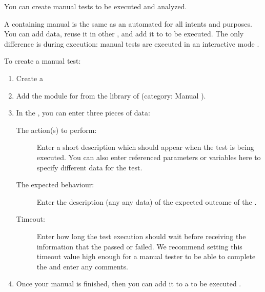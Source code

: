 You can create manual tests to be executed and analyzed.

A \gdcase{} containing manual \gdsteps{} is the same as an automated \gdcase{} for all intents and purposes. You can add data, reuse it in other \gdcases{}, and add it to \gdsuites{} to be executed. The only difference is during execution: manual tests are executed in an interactive mode . 

To create a manual test:
\begin{enumerate}
\item Create a \gdcase{} 
\item Add the module for  from the library of \gdcases{} (category: Manual \gdstep{}).
\item In the \gdpropview{}, you can enter three pieces of data:
\begin{description}
\item[The action(s) to perform:]{Enter a short description which should appear when the test is being executed. You can also enter referenced parameters   or variables  here to specify different data for the test.}
\item [The expected behaviour:]{Enter the description (any any data) of the expected outcome of the \gdstep{}.}
\item [Timeout:]{Enter how long the test execution should wait before receiving the information that the \gdstep{} passed or failed. We recommend setting this timeout value high enough for a manual tester to be able to complete the \gdstep{} and enter any comments.}
\end{description}
\item Once your manual \gdcase{} is finished, then you can add it to a \gdsuite{}  to be executed .
\end{enumerate}

